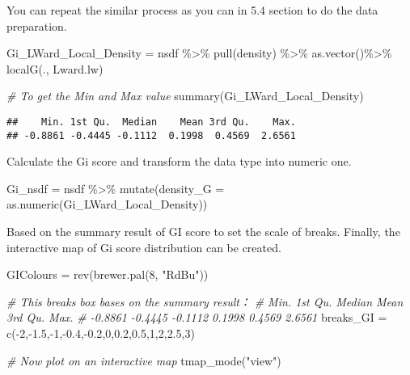 \documentclass[
]{book}
\newenvironment{Shaded}{\begin{snugshade}}{\end{snugshade}}
\newcommand{\AttributeTok}[1]{\textcolor[rgb]{0.77,0.63,0.00}{#1}}
\newcommand{\CommentTok}[1]{\textcolor[rgb]{0.56,0.35,0.01}{\textit{#1}}}
\newcommand{\DecValTok}[1]{\textcolor[rgb]{0.00,0.00,0.81}{#1}}
\newcommand{\FloatTok}[1]{\textcolor[rgb]{0.00,0.00,0.81}{#1}}
\newcommand{\FunctionTok}[1]{\textcolor[rgb]{0.00,0.00,0.00}{#1}}
\newcommand{\NormalTok}[1]{#1}
\newcommand{\OtherTok}[1]{\textcolor[rgb]{0.56,0.35,0.01}{#1}}
\newcommand{\SpecialCharTok}[1]{\textcolor[rgb]{0.00,0.00,0.00}{#1}}
\newcommand{\StringTok}[1]{\textcolor[rgb]{0.31,0.60,0.02}{#1}}
\begin{document}
You can repeat the similar process as you can in 5.4 section to do the data preparation.

\begin{Shaded}
\begin{Highlighting}[]
\NormalTok{Gi\_LWard\_Local\_Density }\OtherTok{=}\NormalTok{ nsdf }\SpecialCharTok{\%\textgreater{}\%}
  \FunctionTok{pull}\NormalTok{(density) }\SpecialCharTok{\%\textgreater{}\%}
  \FunctionTok{as.vector}\NormalTok{()}\SpecialCharTok{\%\textgreater{}\%}
  \FunctionTok{localG}\NormalTok{(., Lward.lw)}

\CommentTok{\# To get the Min and Max value}
\FunctionTok{summary}\NormalTok{(Gi\_LWard\_Local\_Density)}
\end{Highlighting}
\end{Shaded}

\begin{verbatim}
##    Min. 1st Qu.  Median    Mean 3rd Qu.    Max. 
## -0.8861 -0.4445 -0.1112  0.1998  0.4569  2.6561
\end{verbatim}

Calculate the Gi score and transform the data type into numeric one.

\begin{Shaded}
\begin{Highlighting}[]
\NormalTok{Gi\_nsdf }\OtherTok{=}\NormalTok{ nsdf }\SpecialCharTok{\%\textgreater{}\%}
  \FunctionTok{mutate}\NormalTok{(}\AttributeTok{density\_G =} \FunctionTok{as.numeric}\NormalTok{(Gi\_LWard\_Local\_Density))}
\end{Highlighting}
\end{Shaded}

Based on the summary result of GI score to set the scale of breaks. Finally, the interactive map of Gi score distribution can be created.

\begin{Shaded}
\begin{Highlighting}[]
\NormalTok{GIColours }\OtherTok{=} \FunctionTok{rev}\NormalTok{(}\FunctionTok{brewer.pal}\NormalTok{(}\DecValTok{8}\NormalTok{, }\StringTok{"RdBu"}\NormalTok{))}

\CommentTok{\# This breaks box bases on the summary result：}
\CommentTok{\#    Min. 1st Qu.  Median    Mean 3rd Qu.    Max. }
\CommentTok{\# {-}0.8861 {-}0.4445 {-}0.1112  0.1998  0.4569  2.6561 }
\NormalTok{breaks\_GI }\OtherTok{=} \FunctionTok{c}\NormalTok{(}\SpecialCharTok{{-}}\DecValTok{2}\NormalTok{,}\SpecialCharTok{{-}}\FloatTok{1.5}\NormalTok{,}\SpecialCharTok{{-}}\DecValTok{1}\NormalTok{,}\SpecialCharTok{{-}}\FloatTok{0.4}\NormalTok{,}\SpecialCharTok{{-}}\FloatTok{0.2}\NormalTok{,}\DecValTok{0}\NormalTok{,}\FloatTok{0.2}\NormalTok{,}\FloatTok{0.5}\NormalTok{,}\DecValTok{1}\NormalTok{,}\DecValTok{2}\NormalTok{,}\FloatTok{2.5}\NormalTok{,}\DecValTok{3}\NormalTok{)}

\CommentTok{\# Now plot on an interactive map}
\FunctionTok{tmap\_mode}\NormalTok{(}\StringTok{"view"}\NormalTok{)}
\end{Highlighting}
\end{Shaded}
\end{document}
